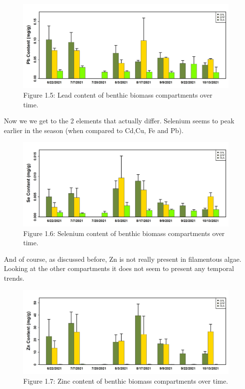 \documentclass[
]{article}
\begin{document}
\FloatBarrier

\begin{figure}
\includegraphics[width=1\linewidth]{Figures/5} \caption[Figure 1.5]{Figure 1.5: Lead content of benthic biomass compartments over time.}\label{fig:unnamed-chunk-5}
\end{figure}

\FloatBarrier

\newpage

Now we we get to the 2 elements that actually differ. Selenium seems to
peak earlier in the season (when compared to Cd,Cu, Fe and Pb).

\begin{figure}
\includegraphics[width=1\linewidth]{Figures/6} \caption[Figure 1.6]{Figure 1.6: Selenium content of benthic biomass compartments over time.}\label{fig:unnamed-chunk-6}
\end{figure}

\FloatBarrier

And of course, as discussed before, Zn is not really present in
filamentous algae. Looking at the other compartments it does not seem to
present any temporal trends.

\begin{figure}
\includegraphics[width=1\linewidth]{Figures/7} \caption[Figure 1.7]{Figure 1.7: Zinc content of benthic biomass compartments over time.}\label{fig:unnamed-chunk-7}
\end{figure}
\end{document}
